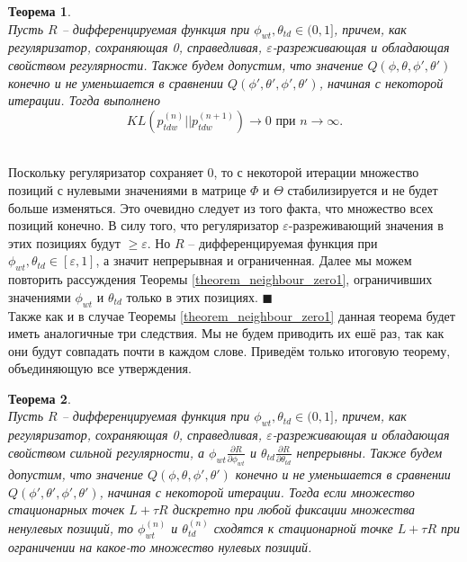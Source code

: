 \documentclass[12pt]{article}
\newtheorem{theorem}{Теорема}
\newenvironment{Proof} 
	{\par\noindent{\bf Доказательство.}} 
	{\hfill$\blacksquare$}
\renewcommand{\geq}{\geqslant}
\begin{document}
\begin{theorem} \label{theorem_neighbour_zero2} \ \\
	Пусть $R$ -- дифференцируемая функция при $\phi_{wt}, \theta_{td} \in (0, 1]$, причем, как регуляризатор, сохраняющая 0, справедливая, $\varepsilon$-разреживающая и обладающая свойством регулярности. Также будем допустим,  что значение $Q(\phi, \theta, \phi', \theta')$ конечно и не уменьшается в сравнении $Q(\phi', \theta', \phi', \theta')$, начиная с некоторой итерации. Тогда выполнено
\[
KL(p_{tdw}^{(n)}||p_{tdw}^{(n + 1)}) \to 0 \text{ при } n \to \infty.
\]
\end{theorem}
\begin{Proof}\ \\
Поскольку регуляризатор сохраняет 0, то с некоторой итерации множество позиций с нулевыми значениями в матрице $\Phi$ и $\Theta$ стабилизируется и не будет больше изменяться. Это очевидно следует из того факта, что  множество всех позиций конечно. В силу того, что регуляризатор $\varepsilon$-разреживающий значения в этих позициях будут $\geq \varepsilon$. Но $R$ -- дифференцируемая функция при $\phi_{wt}, \theta_{td} \in [\varepsilon, 1]$, а значит непрерывная и ограниченная. Далее мы можем повторить рассуждения Теоремы \ref{theorem_neighbour_zero1}, ограничивших значениями $\phi_{wt}$ и $\theta_{td}$ только в этих позициях. 
\end{Proof}\ \\
Также как и в случае Теоремы \ref{theorem_neighbour_zero1} данная теорема будет иметь аналогичные три следствия. Мы не будем приводить их ешё раз, так как они будут совпадать почти в каждом слове. Приведём только итоговую теорему, объединяющую все утверждения.
\begin{theorem} \label{theorem_convergence1} \ \\
	Пусть $R$ -- дифференцируемая функция при $\phi_{wt}, \theta_{td} \in (0, 1]$, причем, как регуляризатор, сохраняющая 0, справедливая, $\varepsilon$-разреживающая и обладающая свойством сильной регулярности, а  $\phi_{wt}\frac{\partial{R}}{\partial{\phi_{wt}}}$ и $\theta_{td} \frac{\partial{R}}{\partial{\theta_{td}}}$ непрерывны. Также будем допустим,  что значение $Q(\phi, \theta, \phi', \theta')$ конечно и не уменьшается в сравнении $Q(\phi', \theta', \phi', \theta')$, начиная с некоторой итерации. Тогда если множество стационарных точек $L + \tau R$ дискретно при любой фиксации множества ненулевых позиций, то $\phi_{wt}^{(n)}$ и $\theta_{td}^{(n)}$ сходятся к стационарной точке $L + \tau R$ при ограничении на какое-то множество нулевых позиций.
\end{theorem}
\end{document}
